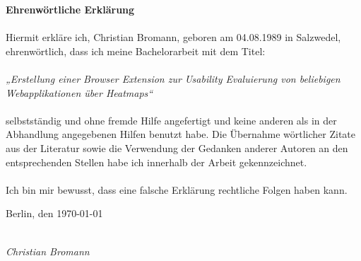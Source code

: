 %
%

\newpage

\thispagestyle{empty}

\begin{large}

\vspace*{1cm}

\noindent
{\Huge \textbf{Ehrenwörtliche Erklärung}}\\
\\
Hiermit erkläre ich, Christian Bromann, geboren am 04.08.1989 in Salzwedel, ehrenwörtlich, dass ich meine Bachelorarbeit mit dem Titel:\\
\\
\textit{„Erstellung einer Browser Extension zur Usability Evaluierung von beliebigen Webapplikationen über Heatmaps“}\\
\\
selbstständig und ohne fremde Hilfe angefertigt und keine anderen als in der Abhandlung angegebenen Hilfen benutzt habe.
Die Übernahme wörtlicher Zitate aus der Literatur sowie die Verwendung der Gedanken anderer Autoren an den entsprechenden Stellen habe ich innerhalb der Arbeit gekennzeichnet.\\
\\
Ich bin mir bewusst, dass eine falsche Erklärung rechtliche Folgen haben kann.

\vspace{2cm}

\noindent
Berlin, den \today

\vspace{3cm}

\hspace*{7cm}%
\dotfill\\
\hspace*{9.5cm}%
\textit{Christian Bromann}

\end{large}
